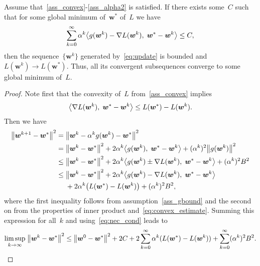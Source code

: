 \begin{theorem}\label{thm:convergence}
  Assume that~\ref{ass_convex}-\ref{ass_alpha2} is satisfied. If there exists some~$C$ such that for some global minimum of~$\bm{w}^*$ of~$L$ we have
  \begin{equation}\label{eq:nec_cond}
    \sum_{k=0}^\infty \alpha^k \inner{g(\bm{w}^k) - \nabla L(\bm{w}^k)}{\bm{w}^* - \bm{w}^k} \leq C,
  \end{equation}
  then the sequence~$\{\bm{w}^k\}$ generated by~\eqref{eq:update} is bounded and~$L(\bm{w}^k) \to L(\bm{w}^*)$. Thus, all its convergent subsequences converge to some global minimum of~$L$.
\end{theorem}
\begin{proof}
  Note first that the convexity of~$L$ from~\ref{ass_convex} implies
  \begin{equation}\label{eq:convex_estimate}
    \inner{\nabla L(\bm{w}^k)}{\bm{w}^* - \bm{w}^k} \leq L(\bm{w}^*) - L(\bm{w}^k).
  \end{equation}
  Then we have
  \begin{equation*}
    \begin{aligned}
      \norm{\bm{w}^{k+1} - \bm{w}^*}^2
        = \; & \norm{\bm{w}^k - \alpha^k g(\bm{w}^k) - \bm{w}^*}^2 \\
        = \; &\norm{\bm{w}^k - \bm{w}^*}^2 + 2\alpha^k\inner{g(\bm{w}^k)}{\bm{w}^* - \bm{w}^k} + (\alpha^k)^2 \norm{g(\bm{w}^k)}^2 \\
        \leq \; &\norm{\bm{w}^k - \bm{w}^*}^2 + 2\alpha^k\inner{g(\bm{w}^k) \pm \nabla L(\bm{w}^k)}{\bm{w}^* - \bm{w}^k} + (\alpha^k)^2 B^2\\
        \leq \; & \norm{\bm{w}^k - \bm{w}^*}^2 + 2 \alpha^k \inner{g(\bm{w}^k) - \nabla L(\bm{w}^k)}{\bm{w}^* - \bm{w}^k} \\
        & + 2 \alpha^k \Brac{L(\bm{w}^*) - L(\bm{w}^k)} + (\alpha^k)^2 B^2,
    \end{aligned}
  \end{equation*}
  where the first inequality follows from assumption~\ref{ass_gbound} and the second on from the properties of inner product and~\eqref{eq:convex_estimate}. Summing this expression for all~$k$ and using~\eqref{eq:nec_cond} leads to
  \begin{equation*}
    \limsup_{k \rightarrow \infty} \; \norm{\bm{w}^k - \bm{w}^*}^2
      \leq \norm{\bm{w}^0 - \bm{w}^*}^2 + 2C + 2 \sum_{k=0}^\infty \alpha^k (L(\bm{w}^*) - L(\bm{w}^k)) + \sum_{k=0}^ \infty (\alpha^k)^2 B^2.
\end{equation*}

\end{proof}
